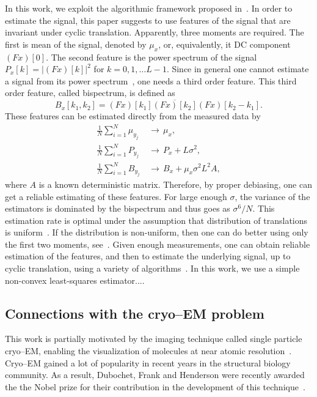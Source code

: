 \documentclass[journal]{IEEEtran}
\newcommand{\TODO}[1]{{\color{red}{[#1]}}}
\numberwithin{equation}{section}
\numberwithin{figure}{section}
\theoremstyle{plain}
\theoremstyle{definition}
\theoremstyle{remark}
\theoremstyle{plain}
\theoremstyle{remark}
\theoremstyle{plain}
\theoremstyle{plain}
\begin{document}
In this work, we exploit the algorithmic framework proposed in~\cite{bendory2017bispectrum}. In order to estimate the signal, this paper suggests to use features of the signal that are invariant under cyclic translation.
Apparently, three moments are required. The first is mean of the signal, denoted by $\mu_x$, or, equivalently, it DC component $(Fx)[0]$. The second feature is the power spectrum of the signal $P_x[k] = \vert (Fx)[k]\vert^2$ for $k=0,1,\ldots L-1$. Since in general one cannot estimate  a signal from its power spectrum~\cite{bendory2017fourier}, one needs a third order feature. This third order feature, called bispectrum, is defined as~\cite{tukey1953}
\begin{equation}
B_x[k_1,k_2] = (Fx)[k_1]\overline{(Fx)[k_2]}(Fx)[k_2-k_1].
\end{equation}  
These features can be estimated directly from the measured data by
\begin{align} \label{eq:moment_estimation}
\frac{1}{N}\sum_{i=1}^N\mu_{y_j}  &\,\to \, \mu_x, \nonumber\\
\frac{1}{N}\sum_{i=1}^NP_{y_j}  &\,\to \, P_x + L\sigma^2, \\
\frac{1}{N}\sum_{i=1}^NB_{y_j}  &\,\to \, B_x + \mu_x\sigma^2L^2A,  \nonumber
\end{align} 
where $A$ is a known deterministic matrix. Therefore, by proper debiasing, one can get a reliable estimating of these features. For large enough $\sigma$, the variance of the estimators  is dominated by the bispectrum and thus goes as $\sigma^6/N$. This estimation rate is optimal under the assumption that distribution of translations is uniform~\cite{bandeira2017optimal}. If the distribution is non-uniform, then one can do better using only the first two moments, see~\cite{abbe2017multireference}. 
 Given enough measurements, one can obtain reliable estimation of the features, and then to estimate the underlying signal, up to cyclic translation, using a variety of algorithms~\cite{bendory2017bispectrum}. In this work, we use a simple non-convex least-squares estimator.... \TODO{Need to see what do we actually solve...}




\subsection{Connections with the cryo--EM problem} \label{sec:cryoEM}

This work is partially motivated by the imaging
technique called single particle cryo--EM, enabling the visualization of molecules at near atomic resolution~\cite{bartesaghi20152,sirohi20163}. Cryo--EM gained a lot of popularity in recent years in the structural biology community. As a result, Dubochet, Frank and Henderson were recently awarded the 
the Nobel prize for their contribution in the development of this technique~\cite{nobel}. 
\end{document}
